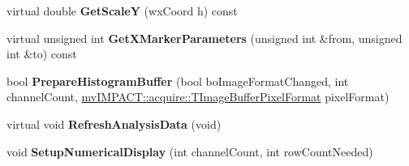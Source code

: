 \begin{DoxyCompactItemize}
\item 
\hypertarget{class_histogram_canvas_a78c74ed8d78bb368262441698404aaf5}{virtual double {\bfseries Get\+Scale\+Y} (wx\+Coord h) const }\label{class_histogram_canvas_a78c74ed8d78bb368262441698404aaf5}

\item 
\hypertarget{class_histogram_canvas_ab39f6444732502e33830efaedb09c918}{virtual unsigned int {\bfseries Get\+X\+Marker\+Parameters} (unsigned int \&from, unsigned int \&to) const }\label{class_histogram_canvas_ab39f6444732502e33830efaedb09c918}

\item 
\hypertarget{class_histogram_canvas_abf75367ac99923e2d54223a88d5f0ab0}{bool {\bfseries Prepare\+Histogram\+Buffer} (bool bo\+Image\+Format\+Changed, int channel\+Count, \hyperlink{group___common_interface_ga456e8aa76e06bb761f27c52141475985}{mv\+I\+M\+P\+A\+C\+T\+::acquire\+::\+T\+Image\+Buffer\+Pixel\+Format} pixel\+Format)}\label{class_histogram_canvas_abf75367ac99923e2d54223a88d5f0ab0}

\item 
\hypertarget{class_histogram_canvas_a0c919e956b18d4dbbfea41f46e853490}{virtual void {\bfseries Refresh\+Analysis\+Data} (void)}\label{class_histogram_canvas_a0c919e956b18d4dbbfea41f46e853490}

\item 
\hypertarget{class_histogram_canvas_af93f7d8f2455e5010579625eeb456306}{void {\bfseries Setup\+Numerical\+Display} (int channel\+Count, int row\+Count\+Needed)}\label{class_histogram_canvas_af93f7d8f2455e5010579625eeb456306}

\end{DoxyCompactItemize}
